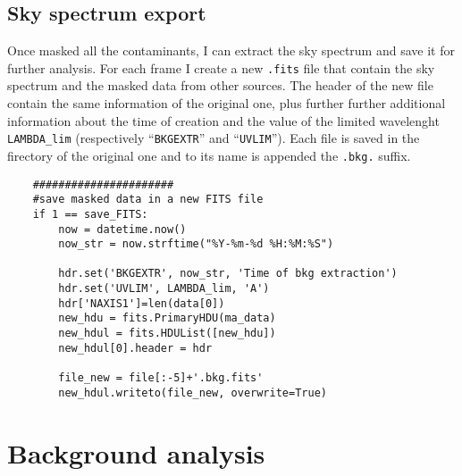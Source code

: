 \subsection{Sky spectrum export}
Once masked all the contaminants, I can extract the sky spectrum and save it for further analysis. For each frame I create a new \texttt{.fits} file that contain the sky spectrum and the masked data from other sources. The header of the new file contain the same information of the original one, plus further further additional information about the time of creation and the value of the limited wavelenght \texttt{LAMBDA\_lim} (respectively ``\texttt{BKGEXTR}'' and ``\texttt{UVLIM}''). Each file is saved in the firectory of the original one and to its name is appended the \texttt{.bkg.} suffix.

\begin{lstlisting}
	######################
	#save masked data in a new FITS file
	if 1 == save_FITS:
		now = datetime.now()
		now_str = now.strftime("%Y-%m-%d %H:%M:%S")
	
		hdr.set('BKGEXTR', now_str, 'Time of bkg extraction')
		hdr.set('UVLIM', LAMBDA_lim, 'A')
		hdr['NAXIS1']=len(data[0])
		new_hdu = fits.PrimaryHDU(ma_data)
		new_hdul = fits.HDUList([new_hdu])
		new_hdul[0].header = hdr
	
		file_new = file[:-5]+'.bkg.fits'
		new_hdul.writeto(file_new, overwrite=True)
\end{lstlisting}

\section{Background analysis}

